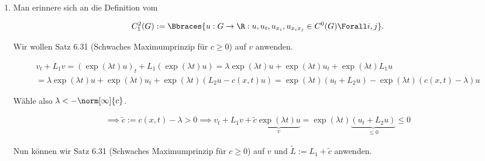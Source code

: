 
\begin{solution}

\phantom{}

\begin{enumerate}[label = (\roman*)]

  \item Man erinnere sich an die Definition vom
  
  \begin{align*}
    C_1^2(G)
    :=
    \Bbraces
    {
      u:
      G \to \R:
      u, u_t, u_{x_i}, u_{x_i x_j} \in C^0(G)
      \Forall i, j
    }.
  \end{align*}

  Wir wollen Satz 6.31 (Schwaches Maximumprinzip für $c \geq 0$) auf $v$ anwenden.


  \begin{multline*}
    v_t + L_1 v
    =
    (\exp(\lambda t) u)_t + L_1 (\exp(\lambda t) u)
    =
    \lambda \exp(\lambda t) u + \exp(\lambda t) u_t
    +
    \exp(\lambda t) L_1 u \\
    =
    \lambda \exp(\lambda t) u + \exp(\lambda t) u_t
    +
    \exp(\lambda t) (L_2 u - c(x, t) u)
    =
    \exp(\lambda t) (u_t +  L_2 u)
    -
    \exp(\lambda t) (c(x, t) - \lambda) u
  \end{multline*}

  Wähle also $\lambda < -\norm[\infty]{c}$.

  \begin{align*}
    \implies
    \tilde{c} := c(x, t) - \lambda > 0
    \implies
    v_t + L_1 v + \tilde{c} \underbrace{\exp(\lambda t) u}_v
    =
    \exp(\lambda t)
    \underbrace
    {
      (u_t +  L_2 u)
    }_{
      \leq 0
    }
    \leq
    0
  \end{align*}

  Nun können wir Satz 6.31 (Schwaches Maximumprinzip für $c \geq 0$) auf $v$ und $\tilde{L} := L_1 + \tilde{c}$ anwenden.


\end{enumerate}
\end{solution}

